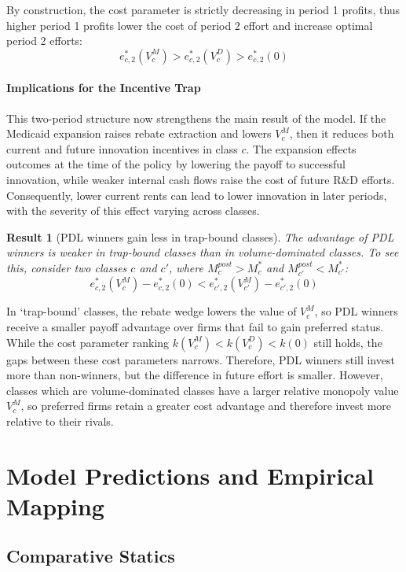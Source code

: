 \documentclass[12pt]{article}
\newtheorem{result}{Result}
\begin{document}
By construction, the cost parameter is strictly decreasing in period 1 profits, thus higher period 1 profits lower the cost of period 2 effort and increase optimal period 2 efforts:
\begin{equation} \label{eq:effort_ranking}
    e_{c,2}^*(V_c^M) > e_{c,2}^*(V_c^D) > e_{c,2}^*(0)
\end{equation}

\paragraph{Implications for the Incentive Trap}
This two-period structure now strengthens the main result of the model. If the Medicaid expansion raises rebate extraction and lowers $V_c^M$, then it reduces both current and future innovation incentives in class $c$. The expansion effects outcomes at the time of the policy by lowering the payoff to successful innovation, while weaker internal cash flows raise the cost of future R\&D efforts. Consequently, lower current rents can lead to lower innovation in later periods, with the severity of this effect varying across classes.

\begin{result}[PDL winners gain less in trap-bound classes] \label{res:dynamic}
The advantage of PDL winners is weaker in trap-bound classes than in volume-dominated classes. To see this, consider two classes $c$ and $c'$, where $M_c^{post} > M_c^*$ and $M_{c'}^{post} < M_{c'}^*$:
\[
e_{c,2}^*(V_c^M) - e_{c,2}^*(0) < e_{c',2}^*(V_{c'}^M) - e_{c',2}^*(0)
\]
\end{result}

In `trap-bound' classes, the rebate wedge lowers the value of $V_c^M$, so PDL winners receive a smaller payoff advantage over firms that fail to gain preferred status. While the cost parameter ranking $k(V_c^M) < k(V_c^D) < k(0)$ still holds, the gaps between these cost parameters narrows. Therefore, PDL winners still invest more than non-winners, but the difference in future effort is smaller. However, classes which are volume-dominated classes have a larger relative monopoly value $V_c^M$, so preferred firms retain a greater cost advantage and therefore invest more relative to their rivals.

\section{Model Predictions and Empirical Mapping}

\subsection{Comparative Statics} \label{sec:comp_statics}
\end{document}
